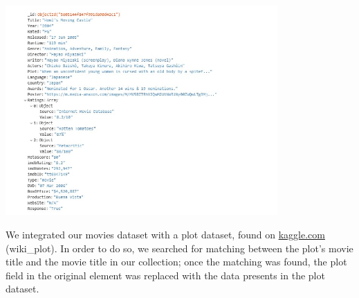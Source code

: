 \documentclass[a4paper, oneside]{article}
\begin{document}
\begin{minipage}{\linewidth}
\begin{center}
\includegraphics[height = 80mm]{./images/screens/elementJSONExample.jpg} 
\vspace{2mm}
\label{fig:elementJSONExample}
\vspace{5mm}
\end{center}
\end{minipage}
We integrated our movies dataset with a plot dataset, found on \url{kaggle.com} (wiki\_plot). In order to do so, we searched for matching between the plot’s movie title and the movie title in our collection; once the matching was found, the plot field in the original element was replaced with the data presents in the plot dataset.\\

\end{document}
